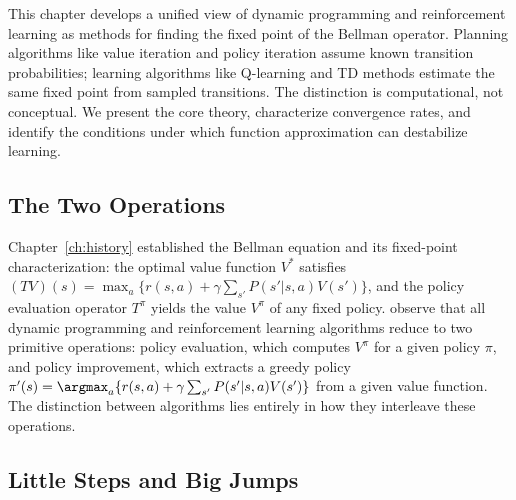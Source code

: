 
This chapter develops a unified view of dynamic programming and reinforcement learning as methods for finding the fixed point of the Bellman operator. Planning algorithms like value iteration and policy iteration assume known transition probabilities; learning algorithms like Q-learning and TD methods estimate the same fixed point from sampled transitions. The distinction is computational, not conceptual. We present the core theory, characterize convergence rates, and identify the conditions under which function approximation can destabilize learning.

\subsection{The Two Operations}
\label{sec:two_operations}

Chapter~\ref{ch:history} established the Bellman equation and its fixed-point characterization: the optimal value function $V^*$ satisfies $(TV)(s) = \max_{a} \{ r(s,a) + \gamma \sum_{s'} P(s'|s,a) V(s') \}$, and the policy evaluation operator $T^\pi$ yields the value $V^\pi$ of any fixed policy. \citet{sutton2018} observe that all dynamic programming and reinforcement learning algorithms reduce to two primitive operations: policy evaluation, which computes $V^\pi$ for a given policy $\pi$, and policy improvement, which extracts a greedy policy $\pi'(s) = \argmax_a \{ r(s,a) + \gamma \sum_{s'} P(s'|s,a) V(s') \}$ from a given value function. The distinction between algorithms lies entirely in how they interleave these operations.


\subsection{Little Steps and Big Jumps}
\label{sec:vi_pi}

